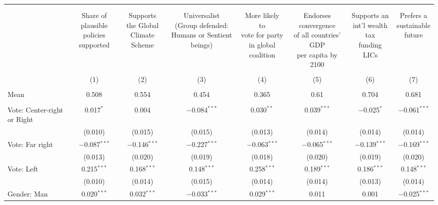 
\begin{tabular}{@{\extracolsep{5pt}}lccccccc} 
\\[-1.8ex]\hline 
\hline \\[-1.8ex] 
\\[-1.8ex] & \makecell{Share of\\plausible policies\\supported} & \makecell{Supports\\the Global\\Climate Scheme} & \makecell{Universalist\\(Group defended:\\Humans or Sentient beings)} & \makecell{More likely to\\vote for party\\in global coalition} & \makecell{Endorses convergence\\of all countries' GDP\\per capita by 2100} & \makecell{Supports an\\int'l wealth tax\\funding LICs} & \makecell{Prefers a\\sustainable\\future} \\ 
\\[-1.8ex] & (1) & (2) & (3) & (4) & (5) & (6) & (7)\\ 
\hline \\[-1.8ex] 
Mean & 0.508 & 0.554 & 0.454 & 0.365 & 0.61 & 0.704 & 0.681  \\ \hline \\[-1.8ex]
 Vote: Center\mbox{-}right or Right & 0.017$^{*}$ & 0.004 & $-$0.084$^{***}$ & 0.030$^{**}$ & 0.039$^{***}$ & $-$0.025$^{*}$ & $-$0.061$^{***}$ \\ 
  & (0.010) & (0.015) & (0.015) & (0.013) & (0.014) & (0.014) & (0.014) \\ 
  Vote: Far right & $-$0.087$^{***}$ & $-$0.146$^{***}$ & $-$0.227$^{***}$ & $-$0.063$^{***}$ & $-$0.065$^{***}$ & $-$0.139$^{***}$ & $-$0.169$^{***}$ \\ 
  & (0.013) & (0.020) & (0.019) & (0.018) & (0.020) & (0.019) & (0.020) \\ 
  Vote: Left & 0.215$^{***}$ & 0.168$^{***}$ & 0.148$^{***}$ & 0.258$^{***}$ & 0.189$^{***}$ & 0.186$^{***}$ & 0.148$^{***}$ \\ 
  & (0.010) & (0.014) & (0.015) & (0.014) & (0.014) & (0.013) & (0.014) \\ 
  Gender: Man & 0.020$^{***}$ & 0.032$^{***}$ & $-$0.033$^{***}$ & 0.029$^{***}$ & 0.011 & 0.001 & $-$0.025$^{***}$ \\ 

\end{tabular}
